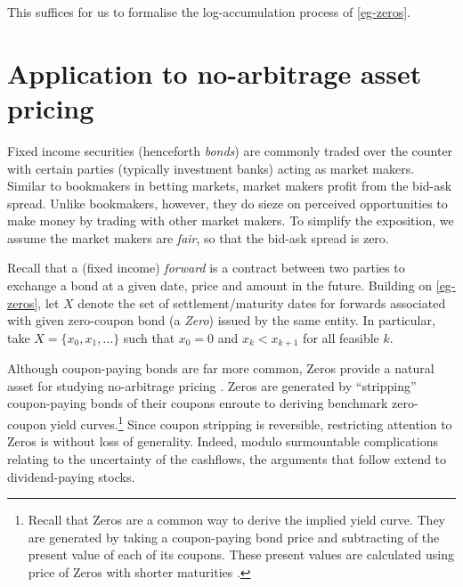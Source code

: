 \documentclass[12pt,a4paper,twoside]{article}
\begin{document}
This suffices for us to formalise the log-accumulation process of
\cref{eg-zeros}.

\section{Application to no-arbitrage asset pricing}\label{sec-fin-app} Fixed
income securities (henceforth \emph{bonds}) are commonly traded over the
counter with certain parties (typically investment banks) acting as market
makers. Similar to bookmakers in betting markets, market makers profit from the
bid-ask spread. Unlike bookmakers, however, they do sieze on perceived
opportunities to make money by trading with other market makers. To simplify
the exposition, we assume the market makers are \emph{fair}, so that the
bid-ask spread is zero.

Recall that a (fixed income) \emph{forward} is a contract between two parties
to exchange a bond at a given date, price and amount in the future.  Building
on \cref{eg-zeros}, let $X$ denote the set of settlement/maturity dates for
forwards associated with given zero-coupon bond (a \emph{Zero}) issued by the
same entity. In particular, take $X = \{x_0, x_1, \dots\}$ such that $x_0 = 0$
and $x_k < x_{k + 1}$ for all feasible $k$. 
\begin{remark*}
  Although coupon-paying bonds are far more common, Zeros provide a
  natural asset for studying no-arbitrage pricing
  \citep{barillas2019speculation}.  Zeros are generated by ``stripping''
  coupon-paying bonds of their coupons enroute to deriving benchmark
  zero-coupon yield curves.\footnote{Recall that Zeros are a common way to
  derive the implied yield curve. They are generated by taking a coupon-paying
  bond price and subtracting of the present value of each of its coupons. These
  present values are calculated using price of Zeros with shorter maturities
  \citep{brealey2020principles}.} Since coupon stripping is reversible,
  restricting attention to Zeros is without loss of generality.  Indeed, modulo
  surmountable complications relating to the uncertainty of the cashflows, the
  arguments that follow extend to dividend-paying stocks.
\end{remark*}
\end{document}
